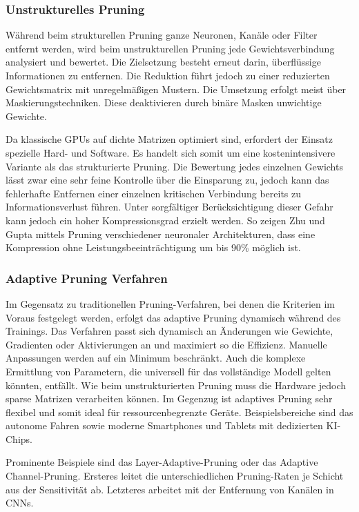 \subsubsection{Unstrukturelles Pruning}

Während beim strukturellen Pruning ganze Neuronen, Kanäle oder Filter entfernt
werden, wird beim unstrukturellen Pruning jede Gewichtsverbindung analysiert
und bewertet. Die Zielsetzung besteht erneut darin, überflüssige Informationen
zu entfernen. Die Reduktion führt jedoch zu einer reduzierten Gewichtsmatrix
mit unregelmäßigen Mustern. Die Umsetzung erfolgt meist über
Maskierungstechniken. Diese deaktivieren durch binäre Masken unwichtige
Gewichte. \autocite[Vgl.][S. 3]{cheng2024survey}

Da klassische GPUs auf dichte Matrizen optimiert sind, erfordert der Einsatz
spezielle Hard- und Software. Es handelt sich somit um eine kostenintensivere
Variante als das strukturierte Pruning. Die Bewertung jedes einzelnen Gewichts
lässt zwar eine sehr feine Kontrolle über die Einsparung zu, jedoch kann das
fehlerhafte Entfernen einer einzelnen kritischen Verbindung bereits zu
Informationsverlust führen. Unter sorgfältiger Berücksichtigung dieser Gefahr
kann jedoch ein hoher Kompressionsgrad erzielt werden. So zeigen Zhu und Gupta
mittels Pruning verschiedener neuronaler Architekturen, dass eine Kompression
ohne Leistungsbeeinträchtigung um bis 90\% möglich ist.\autocites[Vgl.][S.3]{cheng2024survey}[S. 6-8]{zhu2022prune}

\subsubsection{Adaptive Pruning Verfahren}

Im Gegensatz zu traditionellen Pruning-Verfahren, bei denen die Kriterien im
Voraus festgelegt werden, erfolgt das adaptive Pruning dynamisch während des
Trainings. Das Verfahren passt sich dynamisch an Änderungen wie Gewichte,
Gradienten oder Aktivierungen an und maximiert so die Effizienz. Manuelle
Anpassungen werden auf ein Minimum beschränkt. Auch die komplexe Ermittlung
von Parametern, die universell für das vollständige Modell gelten könnten,
entfällt. Wie beim unstrukturierten Pruning muss die Hardware jedoch sparse
Matrizen verarbeiten können. Im Gegenzug ist adaptives Pruning sehr flexibel
und somit ideal für ressourcenbegrenzte Geräte. Beispielsbereiche sind das
autonome Fahren sowie moderne Smartphones und Tablets mit dedizierten KI-Chips.

Prominente Beispiele sind das Layer-Adaptive-Pruning oder das Adaptive
Channel-Pruning. Ersteres leitet die unterschiedlichen Pruning-Raten je Schicht
aus der Sensitivität ab. Letzteres arbeitet mit der Entfernung von Kanälen in
CNNs. \autocites[Vgl.][S. 295-296]{sakai2022structured}[S. 1-2]{wang2025adapt}


